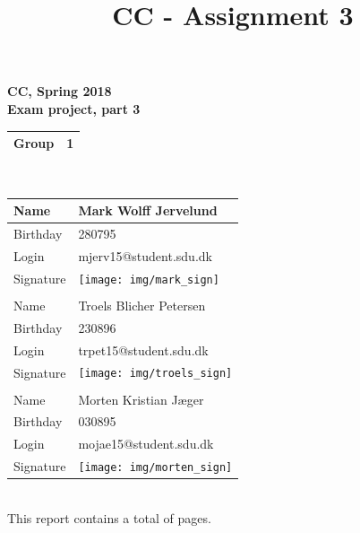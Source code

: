 \documentclass[a4paper,10pt,titlepage]{report}
\date{}
\title{CC - Assignment 3}
\begin{document}
\newpage
{%
\centering
    \huge
    \bfseries
    \vspace{5mm}
CC, Spring 2018\\
Exam project, part 3\\
\vspace{5mm}
\begin{tabular}{|l|l|}
\hline
Group & 1 \\ \hline
\end{tabular}
\\
\vspace{10mm}
\begin{tabular}{@{}ll@{}}
\toprule
\multicolumn{1}{|l|}{Name}      & \multicolumn{1}{l|}{Mark Wolff Jervelund } \\ \midrule
\multicolumn{1}{|l|}{Birthday}  & \multicolumn{1}{l|}{280795} \\ \midrule
\multicolumn{1}{|l|}{Login}     & \multicolumn{1}{l|}{mjerv15@student.sdu.dk} \\ \midrule
\multicolumn{1}{|l|}{Signature} & \multicolumn{1}{l|}{\texttt{[image: img/mark\_sign]}} \\ \midrule
                                &                       \\ \midrule
\multicolumn{1}{|l|}{Name}      &  \multicolumn{1}{l|}{Troels Blicher Petersen} \\ \midrule
\multicolumn{1}{|l|}{Birthday}      &   \multicolumn{1}{l|}{230896} \\ \midrule
\multicolumn{1}{|l|}{Login}      &  \multicolumn{1}{l|}{trpet15@student.sdu.dk} \\ \midrule
\multicolumn{1}{|l|}{Signature}      & \multicolumn{1}{l|}{\texttt{[image: img/troels\_sign]} } \\ \midrule
                                &                       \\ \midrule
\multicolumn{1}{|l|}{Name}     &  \multicolumn{1}{l|}{Morten Kristian Jæger} \\ \midrule
\multicolumn{1}{|l|}{Birthday}      &  \multicolumn{1}{l|}{030895} \\ \midrule
\multicolumn{1}{|l|}{Login}     &   \multicolumn{1}{l|}{mojae15@student.sdu.dk} \\ \midrule
\multicolumn{1}{|l|}{Signature}    &  \multicolumn{1}{l|}{\texttt{[image: img/morten\_sign]}} \\ \midrule
\end{tabular}
\\
\vspace{10mm}
This report contains a total of \underline{ \pageref{LastPage} } pages.
}
\end{document}
